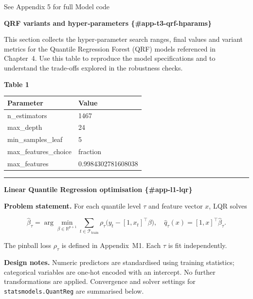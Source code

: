 \documentclass[
  a4paper,
  DIV=11,
  numbers=noendperiod]{scrreprt}
\begin{document}
See Appendix 5 for full Model code

\textbf{QRF variants and hyper‑parameters \{\#app-t3-qrf-hparams\}}

This section collects the hyper‑parameter search ranges, final values
and variant metrics for the Quantile Regression Forest (QRF) models
referenced in Chapter~4. Use this table to reproduce the model
specifications and to understand the trade‑offs explored in the
robustness checks.

\textbf{Table 1}

\begin{longtable}[]{@{}ll@{}}
\toprule\noalign{}
Parameter & Value \\
\midrule\noalign{}
\endhead
\bottomrule\noalign{}
\endlastfoot
n\_estimators & 1467 \\
max\_depth & 24 \\
min\_samples\_leaf & 5 \\
max\_features\_choice & fraction \\
max\_features & 0.9984302781608038 \\
\end{longtable}

\begin{center}\rule{0.5\linewidth}{0.5pt}\end{center}

\textbf{Linear Quantile Regression optimisation \{\#app-l1-lqr\}}

\textbf{Problem statement.} For each quantile level \(\tau\) and feature
vector \(x\), LQR solves

\[
\widehat{\beta}_{\tau} = \arg\min_{\beta\in \mathbb{R}^{p+1}} \sum_{t\in\mathcal{T}_{\text{train}}} \rho_{\tau}\big( y_{t} - [1,x_{t}]^{\top}\beta \big),
\quad
\widehat q_{\tau}(x) = [1,x]^{\top} \widehat{\beta}_{\tau}.
\]

The pinball loss \(\rho_{\tau}\) is defined in Appendix~M1. Each
\(\tau\) is fit independently.

\textbf{Design notes.} Numeric predictors are standardised using
training statistics; categorical variables are one‑hot encoded with an
intercept. No further transformations are applied. Convergence and
solver settings for \texttt{statsmodels.QuantReg} are summarised below.
\end{document}
